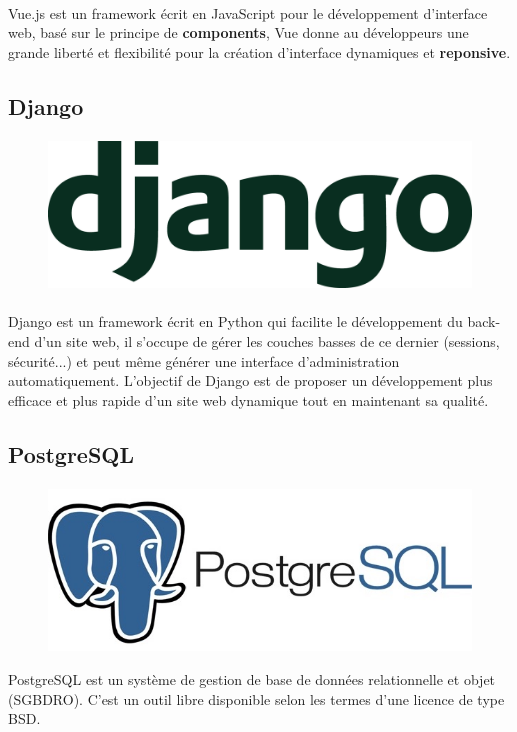 \documentclass[]{report}
\begin{document}
			\paragraph{}
			Vue.js est un framework écrit en JavaScript pour le développement d'interface web, basé sur le principe de \textbf{components}, Vue donne au développeurs une grande liberté et flexibilité pour la création d'interface dynamiques
			et \textbf{reponsive}.
			
		\subsection{Django}
			\paragraph{}
			\begin{figure}[H]
				\centering
				\includegraphics[width=0.25\linewidth]{images/django.png}
			\end{figure}
			\paragraph{}
			Django est un framework écrit en Python qui facilite le développement du back-end d'un site web, il s'occupe de gérer les couches basses de ce dernier (sessions, sécurité...)   et peut même générer une interface d'administration automatiquement. L’objectif  de Django est de proposer un développement plus efficace et plus rapide d'un site web dynamique tout en maintenant sa qualité.
		\subsection{PostgreSQL}
			\paragraph{}
			\begin{figure}[H]
				\centering
				\includegraphics[width=0.25\linewidth]{images/postgresql.jpg}
			\end{figure}
			PostgreSQL est un système de gestion de base de données relationnelle et objet (SGBDRO). C'est un outil libre disponible selon les termes d'une licence de type BSD.
		
\end{document}
